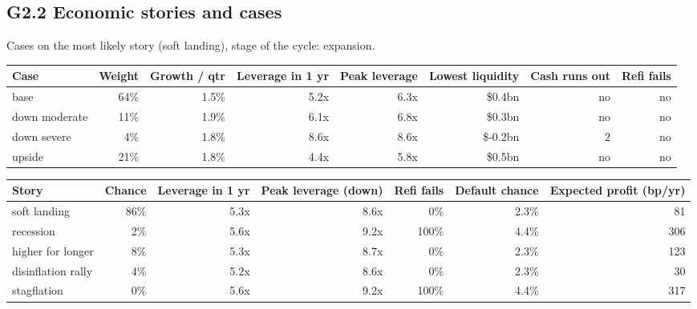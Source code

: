 \documentclass[11pt,a4paper]{article}
\begin{document}
\subsection*{G2.2 Economic stories and cases}
Cases on the most likely story (soft landing), stage of the cycle: expansion.
\begin{center}\scriptsize\setlength{\tabcolsep}{3.5pt}\begin{tabular}{@{}lrrrrrrr@{}}\toprule
Case & Weight & Growth / qtr & Leverage in 1 yr & Peak leverage & Lowest liquidity & Cash runs out & Refi fails \\\midrule
base & 64\% & 1.5\% & 5.2x & 6.3x & \$0.4bn & no & no \\
down moderate & 11\% & 1.9\% & 6.1x & 6.8x & \$0.3bn & no & no \\
down severe & 4\% & 1.8\% & 8.6x & 8.6x & \$-0.2bn & 2 & no \\
upside & 21\% & 1.8\% & 4.4x & 5.8x & \$0.5bn & no & no \\
\bottomrule\end{tabular}\end{center}
\begin{center}\scriptsize\setlength{\tabcolsep}{3.5pt}\begin{tabular}{@{}lrrrrrr@{}}\toprule
Story & Chance & Leverage in 1 yr & Peak leverage (down) & Refi fails & Default chance & Expected profit (bp/yr) \\\midrule
soft landing & 86\% & 5.3x & 8.6x & 0\% & 2.3\% & 81 \\
recession & 2\% & 5.6x & 9.2x & 100\% & 4.4\% & 306 \\
higher for longer & 8\% & 5.3x & 8.7x & 0\% & 2.3\% & 123 \\
disinflation rally & 4\% & 5.2x & 8.6x & 0\% & 2.3\% & 30 \\
stagflation & 0\% & 5.6x & 9.2x & 100\% & 4.4\% & 317 \\
\bottomrule\end{tabular}\end{center}
\end{document}
